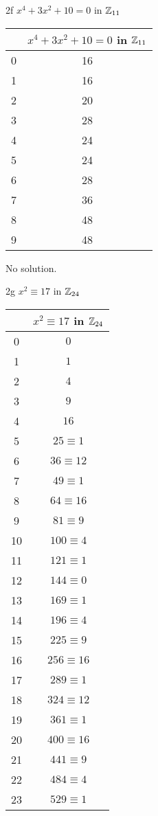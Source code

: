 \begin{question}{2f}
$x^4 + 3x^2 +10 = 0$ in $\mathbb{Z}_{11}$
\end{question}

\begin{tabular}{c|c}
 &$x^4 + 3x^2 +10 = 0$ in $\mathbb{Z}_{11}$\\
\hline
0 & 16\\
1 & 16\\
2 & 20\\
3 & 28\\
4 & 24\\
5 & 24\\
6 & 28\\
7 & 36\\
8 & 48\\
9 & 48
\end{tabular}

No solution.

\begin{question}{2g}
$x^2 \equiv 17$ in $\mathbb{Z}_{24}$

\begin{tabular}{c|c}
& $x^2 \equiv 17$ in $\mathbb{Z}_{24}$\\
\hline
0 & $0$\\
1 & $1$\\
2 & $4$\\
3 & $9$\\
4 & $16$\\
5 & $25 \equiv 1$\\
6 & $36 \equiv 12$\\
7 & $49 \equiv 1$\\
8 & $64 \equiv 16$\\
9 & $81 \equiv 9$\\
10 & $100 \equiv 4$\\
11 & $121 \equiv 1$\\
12 & $144 \equiv 0$\\
13 & $169 \equiv 1$\\
14 & $196 \equiv 4$\\
15 & $225 \equiv 9$\\
16 & $256 \equiv 16$\\
17 & $289 \equiv 1$\\
18 & $324 \equiv 12$\\
19 & $361 \equiv 1$\\
20 & $400 \equiv 16$\\
21 & $441 \equiv 9$\\
22 & $484 \equiv 4$\\
23 & $529 \equiv 1$\\


\end{tabular}
\end{question}


